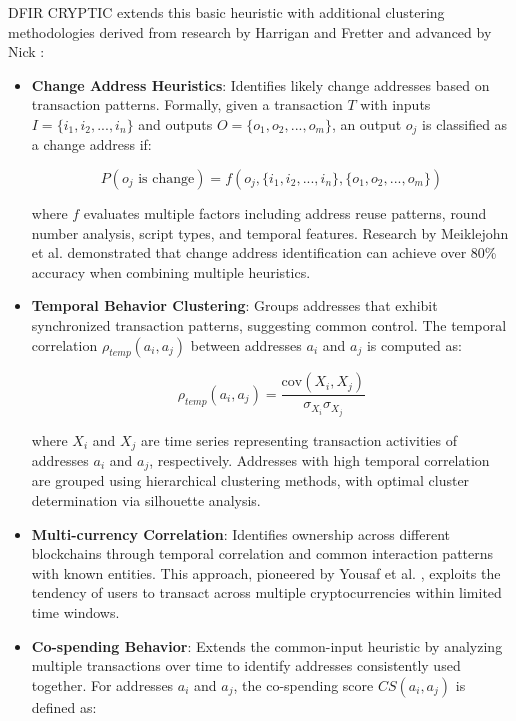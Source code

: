 \documentclass[conference]{IEEEtran}
\begin{document}
DFIR CRYPTIC extends this basic heuristic with additional clustering methodologies derived from research by Harrigan and Fretter \cite{harrigan2016} and advanced by Nick \cite{nick2015}:

\begin{itemize}
    \item \textbf{Change Address Heuristics}: Identifies likely change addresses based on transaction patterns. Formally, given a transaction $T$ with inputs $I = \{i_1, i_2, ..., i_n\}$ and outputs $O = \{o_1, o_2, ..., o_m\}$, an output $o_j$ is classified as a change address if:
    
    \begin{equation}
    P(o_j \text{ is change}) = f(o_j, \{i_1, i_2, ..., i_n\}, \{o_1, o_2, ..., o_m\})
    \end{equation}
    
    where $f$ evaluates multiple factors including address reuse patterns, round number analysis, script types, and temporal features. Research by Meiklejohn et al. \cite{meiklejohn2013} demonstrated that change address identification can achieve over 80\% accuracy when combining multiple heuristics.
    
    \item \textbf{Temporal Behavior Clustering}: Groups addresses that exhibit synchronized transaction patterns, suggesting common control. The temporal correlation $\rho_{temp}(a_i, a_j)$ between addresses $a_i$ and $a_j$ is computed as:
    
    \begin{equation}
    \rho_{temp}(a_i, a_j) = \frac{\text{cov}(X_i, X_j)}{\sigma_{X_i} \sigma_{X_j}}
    \end{equation}
    
    where $X_i$ and $X_j$ are time series representing transaction activities of addresses $a_i$ and $a_j$, respectively. Addresses with high temporal correlation are grouped using hierarchical clustering methods, with optimal cluster determination via silhouette analysis.
    
    \item \textbf{Multi-currency Correlation}: Identifies ownership across different blockchains through temporal correlation and common interaction patterns with known entities. This approach, pioneered by Yousaf et al. \cite{yousaf2019}, exploits the tendency of users to transact across multiple cryptocurrencies within limited time windows.
    
    \item \textbf{Co-spending Behavior}: Extends the common-input heuristic by analyzing multiple transactions over time to identify addresses consistently used together. For addresses $a_i$ and $a_j$, the co-spending score $CS(a_i, a_j)$ is defined as:
    

\end{itemize}
\end{document}
